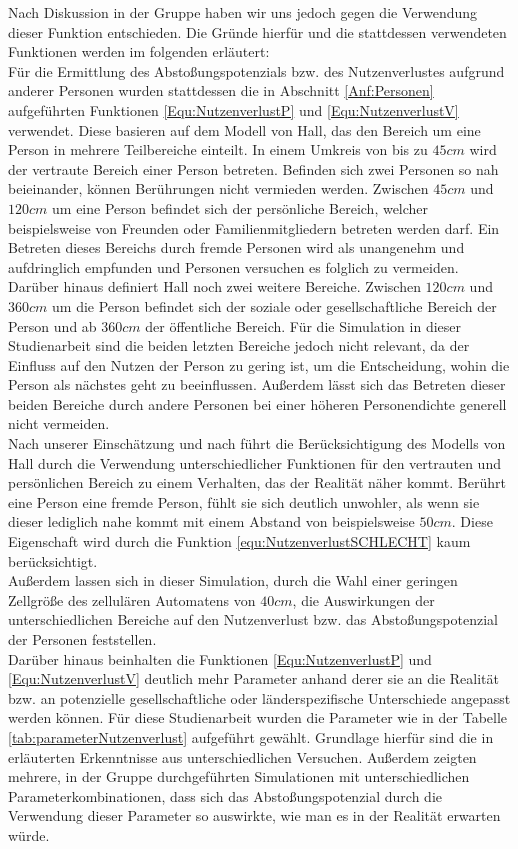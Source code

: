 Nach Diskussion in der Gruppe haben wir uns jedoch gegen die Verwendung dieser Funktion entschieden. Die Gründe hierfür und die stattdessen verwendeten Funktionen werden im folgenden erläutert:\\
Für die Ermittlung des Abstoßungspotenzials bzw. des Nutzenverlustes aufgrund anderer Personen wurden stattdessen die in Abschnitt \ref{Anf:Personen} aufgeführten Funktionen \ref{Equ:NutzenverlustP} und \ref{Equ:NutzenverlustV} verwendet. Diese basieren auf dem Modell von Hall, das den Bereich um eine Person in mehrere Teilbereiche einteilt. In einem Umkreis von bis zu $45cm$ wird der vertraute Bereich einer Person betreten. Befinden sich zwei Personen so nah beieinander, können Berührungen nicht vermieden werden. Zwischen $45cm$ und $120cm$ um eine Person befindet sich der persönliche Bereich, welcher beispielsweise von Freunden oder Familienmitgliedern betreten werden darf. Ein Betreten dieses Bereichs durch fremde Personen wird als unangenehm und aufdringlich empfunden und Personen versuchen es folglich zu vermeiden. Darüber hinaus definiert Hall noch zwei weitere Bereiche. Zwischen $120cm$ und $360cm$ um die Person befindet sich der soziale oder gesellschaftliche Bereich der Person und ab $360cm$ der öffentliche Bereich. Für die Simulation in dieser Studienarbeit sind die beiden letzten Bereiche jedoch nicht relevant, da der Einfluss auf den Nutzen der Person zu gering ist, um die Entscheidung, wohin die Person als nächstes geht zu beeinflussen. Außerdem lässt sich das Betreten dieser beiden Bereiche durch andere Personen bei einer höheren Personendichte generell nicht vermeiden.\\
Nach unserer Einschätzung und nach \cite{VONSIVERS2015104} führt die Berücksichtigung des Modells von Hall durch die Verwendung unterschiedlicher Funktionen für den vertrauten und persönlichen Bereich zu einem Verhalten, das der Realität näher kommt. Berührt eine Person eine fremde Person, fühlt sie sich deutlich unwohler, als wenn sie dieser lediglich nahe kommt mit einem Abstand von beispielsweise $50cm$. Diese Eigenschaft wird durch die Funktion \ref{equ:NutzenverlustSCHLECHT} kaum berücksichtigt.\\
Außerdem lassen sich in dieser Simulation, durch die Wahl einer geringen Zellgröße des zellulären Automatens von $40 cm$, die Auswirkungen der unterschiedlichen Bereiche auf den Nutzenverlust bzw. das Abstoßungspotenzial der Personen feststellen. \\
Darüber hinaus beinhalten die Funktionen \ref{Equ:NutzenverlustP} und \ref{Equ:NutzenverlustV} deutlich mehr Parameter anhand derer sie an die Realität bzw. an potenzielle gesellschaftliche oder länderspezifische Unterschiede angepasst werden können. Für diese Studienarbeit wurden die Parameter wie in der Tabelle \ref{tab:parameterNutzenverlust} aufgeführt gewählt. Grundlage hierfür sind die in \cite{VONSIVERS2015104} erläuterten Erkenntnisse aus unterschiedlichen Versuchen. Außerdem zeigten mehrere, in der Gruppe durchgeführten Simulationen mit unterschiedlichen Parameterkombinationen, dass sich das Abstoßungspotenzial durch die Verwendung dieser Parameter so auswirkte, wie man es in der Realität erwarten würde. \\ 
  
